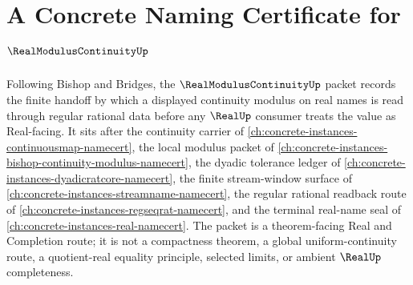 \chapter{A Concrete Naming Certificate for $\RealModulusContinuityUp$}
\label{ch:concrete-instances-real-modulus-continuity-namecert}

Following Bishop and Bridges, the $\RealModulusContinuityUp$ packet records the finite handoff by which a displayed continuity modulus on real names is read through regular rational data before any $\RealUp$ consumer treats the value as Real-facing. It sits after the continuity carrier of \autoref{ch:concrete-instances-continuousmap-namecert}, the local modulus packet of \autoref{ch:concrete-instances-bishop-continuity-modulus-namecert}, the dyadic tolerance ledger of \autoref{ch:concrete-instances-dyadicratcore-namecert}, the finite stream-window surface of \autoref{ch:concrete-instances-streamname-namecert}, the regular rational readback route of \autoref{ch:concrete-instances-regseqrat-namecert}, and the terminal real-name seal of \autoref{ch:concrete-instances-real-namecert}. The packet is a theorem-facing Real and Completion route; it is not a compactness theorem, a global uniform-continuity route, a quotient-real equality principle, selected limits, or ambient $\RealUp$ completeness.

